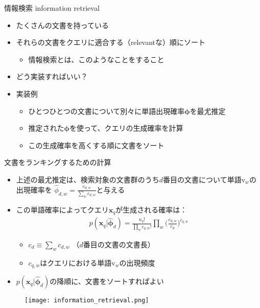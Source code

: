 \documentclass[aspectratio=169,unicode,dvipdfmx,14pt]{beamer}
\begin{document}
\begin{frame}{情報検索 information retrieval}
\begin{itemize}
\item たくさんの文書を持っている
\item それらの文書をクエリに適合する（relevantな）順にソート
\begin{itemize}
\item 情報検索とは、このようなことをすること
\end{itemize}
\item どう実装すればいい？
\item 実装例
\begin{itemize}
\item ひとつひとつの文書について別々に単語出現確率$\bm{\phi}$を最尤推定
\item 推定された$\bm{\phi}$を使って、クエリの生成確率を計算
\item この生成確率を高くする順に文書をソート
\end{itemize}
\end{itemize}
\end{frame}

\begin{frame}{文書をランキングするための計算}
\begin{itemize}
\item 上述の最尤推定は、検索対象の文書群のうち$d$番目の文書について単語$\mbox{v}_w$の出現確率を
$\hat{\phi}_{d,w} = \frac{c_{d,w}}{\sum_w c_{d,w}}$と与える
\item この単語確率によってクエリ$\bm{x}_q$が生成される確率は：
\begin{align}
p(\bm{x}_q | \hat{\bm{\phi}}_d) = \frac{n_q!}{\prod_w c_{q,w}!} \prod_w \bigg( \frac{c_{d,w}}{c_d} \bigg)^{c_{q,w}}
\end{align}
\begin{itemize}
\item $c_d \equiv \sum_w c_{d,w}$ （$d$番目の文書の文書長）
\item $c_{q,w}$はクエリにおける単語$\mbox{v}_w$の出現頻度
\end{itemize}
\item $p(\bm{x}_q | \hat{\bm{\phi}}_d)$の降順に、文書をソートすればよい
\end{itemize}
\end{frame}

\begin{frame}
\begin{figure}[htbp]
\begin{center}
\texttt{[image: information\_retrieval.png]}
\label{}
\end{center}
\end{figure}
\end{frame}
\end{document}
